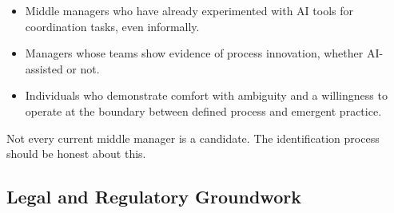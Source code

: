 \begin{itemize}
  \item Middle managers who have already experimented with AI tools for coordination tasks, even informally.
  \item Managers whose teams show evidence of process innovation, whether AI-assisted or not.
  \item Individuals who demonstrate comfort with ambiguity and a willingness to operate at the boundary between defined process and emergent practice.
\end{itemize}

Not every current middle manager is a candidate. The identification process should be honest about this.

\subsection{Legal and Regulatory Groundwork}
\label{sec:legal-groundwork}

